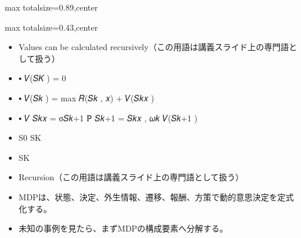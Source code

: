 \begin{minipage}[t]{0.58\textwidth}
\begin{adjustbox}{max totalsize={\textwidth}{0.89\textheight},center}
\begin{minipage}{\textwidth}
\end{minipage}
\end{adjustbox}
\end{minipage}


\clearpage
{}
\begin{minipage}[t]{0.405\textwidth}
\begin{adjustbox}{max totalsize={\textwidth}{0.43\textheight},center}
\begin{minipage}{\textwidth}\scriptsize
{}\begin{itemize}
\item Values can be calculated recursively（この用語は講義スライド上の専門語として扱う）
\item ▪ 𝑉(𝑆𝐾 ) = 0
\item ▪ 𝑉(𝑆𝑘 ) = max 𝑅(𝑆𝑘 , 𝑥) + 𝑉(𝑆𝑘𝑥 )
\item ▪ 𝑉 𝑆𝑘𝑥 = σ𝑆𝑘+1 ℙ 𝑆𝑘+1 = 𝑆𝑘𝑥 , 𝜔𝑘 𝑉(𝑆𝑘+1 )
\item S0 SK
\item SK
\item Recursion（この用語は講義スライド上の専門語として扱う）
\end{itemize}\begin{itemize}
\item MDPは、状態、決定、外生情報、遷移、報酬、方策で動的意思決定を定式化する。
\item 未知の事例を見たら、まずMDPの構成要素へ分解する。
\end{itemize}
\end{minipage}
\end{adjustbox}
\end{minipage}\hfill
